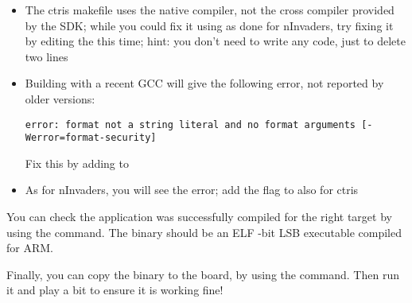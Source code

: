 \begin{itemize}
  \item The ctris makefile uses the native compiler, not the cross compiler
  provided by the SDK; while you could fix it using  as done
  for nInvaders, try fixing it by editing the  this time;
  hint: you don't need to write any code, just to delete two lines

  \item Building with a recent GCC will give the following error, not
  reported by older versions:
\begin{verbatim}
error: format not a string literal and no format arguments [-Werror=format-security]
\end{verbatim}
  Fix this by adding  to 

  \item As for nInvaders, you will see the 
  error; add the  flag to  also for ctris

\end{itemize}

You can check the application was successfully compiled for the right
target by using the  command.  The  binary should be
an ELF -bit LSB
executable compiled for ARM.

Finally, you can copy the binary to the board, by using the 
command. Then run it and play a bit to ensure it is working fine!
